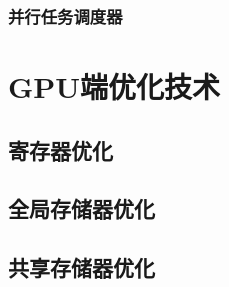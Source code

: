 \subsubsection{并行任务调度器}

\section{GPU端优化技术}\label{sec:gpu-optimization}

\subsection{寄存器优化}

\subsection{全局存储器优化}

\subsection{共享存储器优化}
